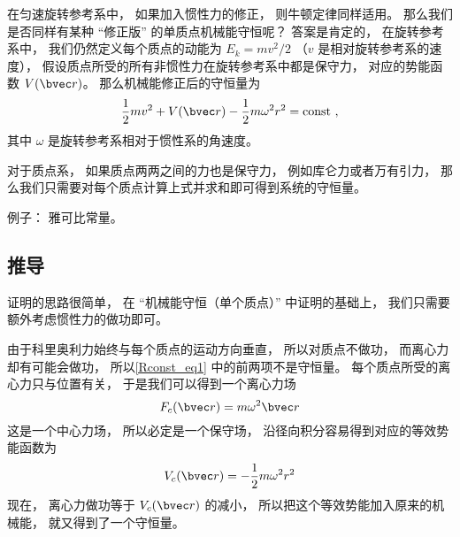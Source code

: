 

在匀速旋转参考系中， 如果加入惯性力的修正， 则牛顿定律同样适用。 那么我们是否同样有某种 “修正版” 的单质点机械能守恒呢？ 答案是肯定的， 在旋转参考系中， 我们仍然定义每个质点的动能为 $E_k = mv^2/2$ （$v$ 是相对旋转参考系的速度）， 假设质点所受的所有非惯性力在旋转参考系中都是保守力， 对应的势能函数 $V(\bvec r)$。 那么机械能修正后的守恒量为
\begin{equation}\label{Rconst_eq1}
\frac{1}{2}m v^2 + V(\bvec r) - \frac{1}{2}m\omega^2 r^2 = \text{const}~,
\end{equation}
其中 $\omega$ 是旋转参考系相对于惯性系的角速度。

对于质点系， 如果质点两两之间的力也是保守力， 例如库仑力或者万有引力， 那么我们只需要对每个质点计算上式并求和即可得到系统的守恒量。

例子： 雅可比常量。

\subsection{推导}
证明的思路很简单， 在 “机械能守恒（单个质点）” 中证明的基础上， 我们只需要额外考虑惯性力的做功即可。

由于科里奥利力始终与每个质点的运动方向垂直， 所以对质点不做功， 而离心力却有可能会做功， 所以\autoref{Rconst_eq1} 中的前两项不是守恒量。 每个质点所受的离心力只与位置有关， 于是我们可以得到一个离心力场
\begin{equation}
F_c(\bvec r) = m\omega^2 \bvec r
\end{equation}
 这是一个中心力场， 所以必定是一个保守场， 沿径向积分容易得到对应的等效势能函数为
\begin{equation}
V_c(\bvec r) = -\frac{1}{2}m\omega^2 r^2
\end{equation}
现在， 离心力做功等于 $V_c(\bvec r)$ 的减小， 所以把这个等效势能加入原来的机械能， 就又得到了一个守恒量。
